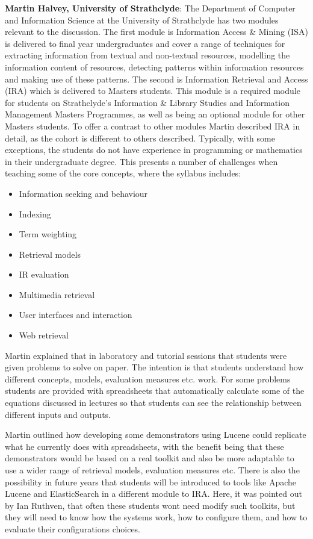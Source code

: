 {\bf Martin Halvey, University of Strathclyde}: The Department of Computer and Information Science at the University of Strathclyde has two modules relevant to the discussion. The first module is Information Access \& Mining (ISA) is delivered to final year undergraduates and cover a range of techniques for extracting information from textual and non-textual resources, modelling the information content of resources, detecting patterns within information resources and making use of these patterns. The second is Information Retrieval and Access (IRA) which is delivered to Masters students. This module is a required module for students on Strathclyde's Information \& Library Studies and Information Management Masters Programmes, as well as being an optional module for other Masters students. To offer a contrast to other modules Martin described IRA in detail, as the cohort is different to others described. Typically, with some exceptions, the students do not have experience in programming or mathematics in their undergraduate degree. This presents a number of challenges when teaching some of the core concepts, where the syllabus includes:
\begin{itemize}
    \item Information seeking and behaviour
	\item Indexing
	\item Term weighting
	\item Retrieval models
	\item IR evaluation
	\item Multimedia retrieval
	\item User interfaces and interaction
	\item Web retrieval 
\end{itemize}

Martin explained that in laboratory and tutorial sessions that students were given problems to solve on paper. The intention is that students understand how different concepts, models, evaluation measures etc. work. For some problems students are provided with spreadsheets that automatically calculate some of the equations discussed in lectures so that students can see the relationship between different inputs and outputs. 

Martin outlined how developing some demonstrators using Lucene could replicate what he currently does with spreadsheets, with the benefit being that these demonstrators would be based on a real toolkit and also be more adaptable to use a wider range of retrieval models, evaluation measures etc. There is also the possibility in future years that students will be introduced to tools like Apache Lucene and ElasticSearch in a different module to IRA. Here, it was pointed out by Ian Ruthven, that often these students wont need modify such toolkits, but they will need to know how the systems work, how to configure them, and how to evaluate their configurations choices.

